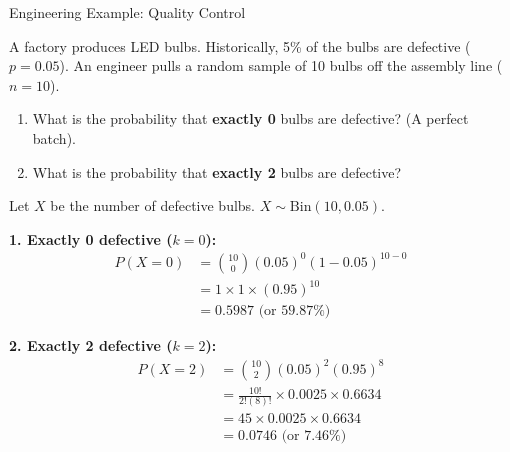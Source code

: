 \begin{frame}[allowframebreaks]{Engineering Example: Quality Control}
    \begin{example}
        A factory produces LED bulbs. Historically, 5\% of the bulbs are defective ($p = 0.05$). An engineer pulls a random sample of 10 bulbs off the assembly line ($n = 10$).
        
        \vspace{0.2cm}
        \begin{enumerate}
            \item What is the probability that \textbf{exactly 0} bulbs are defective? (A perfect batch).
            \item What is the probability that \textbf{exactly 2} bulbs are defective?
        \end{enumerate}
    \end{example}

    \framebreak

    \begin{solution}
        Let $X$ be the number of defective bulbs. $X \sim \text{Bin}(10, 0.05)$.
        
        \vspace{0.2cm}
        \textbf{1. Exactly 0 defective ($k=0$):}
        \begin{align*}
            P(X=0) &= \binom{10}{0} (0.05)^0 (1 - 0.05)^{10-0} \\
                   &= 1 \times 1 \times (0.95)^{10} \\
                   &= \mathbf{0.5987} \text{ (or 59.87\%)}
        \end{align*}
    \end{solution}
    
    \framebreak
    
    \begin{solution}
        \textbf{2. Exactly 2 defective ($k=2$):}
        \begin{align*}
            P(X=2) &= \binom{10}{2} (0.05)^2 (0.95)^8 \\
                   &= \frac{10!}{2!(8)!} \times 0.0025 \times 0.6634 \\
                   &= 45 \times 0.0025 \times 0.6634 \\
                   &= \mathbf{0.0746} \text{ (or 7.46\%)}
        \end{align*}
    \end{solution}
\end{frame}

